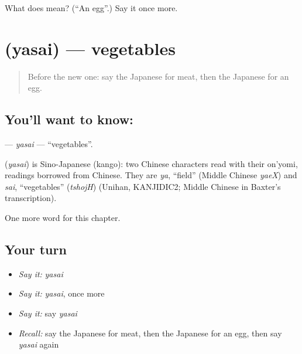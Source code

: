 \begin{tcolorbox}[breakable,colback=teal!4,colframe=teal!35!black,title={Before you move on}]
What does  mean? (\textquotedblleft{}An egg\textquotedblright{}.) Say it once more.
\end{tcolorbox}
\section[\texorpdfstring{\ja{やさい} (yasai)}{やさい (yasai)}]{ (yasai) — vegetables}

\label{lesson:JA-C32-yasai}



\begin{quote}
Before the new one: say the Japanese for meat, then the Japanese for an egg.
\end{quote}

\subsection*{You'll want to know: }
\textbf{} — \emph{yasai} — \textquotedblleft{}vegetables\textquotedblright{}.

\begin{cousinweb}
\textbf{} (\emph{yasai}) is Sino-Japanese (kango): two Chinese characters read with their on'yomi, readings borrowed from Chinese. They are \emph{ya}, \textquotedblleft{}field\textquotedblright{} (Middle Chinese \emph{yaeX}) and \emph{sai}, \textquotedblleft{}vegetables\textquotedblright{} (\emph{tshojH}) (Unihan, KANJIDIC2; Middle Chinese in Baxter's transcription).
\end{cousinweb}

\begin{grammarlens}[title={What you've built}]
One more word for this chapter.
\end{grammarlens}

\subsection*{Your turn}
\begin{itemize}
\raggedright
  \item \emph{Say it:} \emph{yasai}
  \item \emph{Say it:} \emph{yasai}, once more
  \item \emph{Say it:} say \emph{yasai}
  \item \emph{Recall:} say the Japanese for meat, then the Japanese for an egg, then say \emph{yasai} again
\end{itemize}


